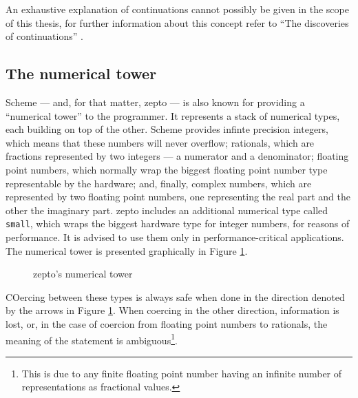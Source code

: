 \documentclass[oneside,11pt,xetex]{scrbook}
\begin{document}
An exhaustive explanation of continuations cannot possibly be given in the scope
of this thesis, for further information about this concept refer to ``The discoveries
of continuations'' \parencite{CONT}.

\subsection{The numerical tower}
\label{numbers}

Scheme --- and, for that matter, zepto --- is also known for providing a ``numerical
tower'' to the programmer. It represents a stack of numerical types, each building
on top of the other. Scheme provides infinte precision integers, which means that
these numbers will never overflow; rationals, which are fractions represented by
two integers --- a numerator and a denominator; floating point numbers, which normally
wrap the biggest floating point number type representable by the hardware; and, finally,
complex numbers, which are represented by two floating point numbers, one representing
the real part and the other the imaginary part. zepto includes an additional numerical
type called \texttt{small}, which wraps the biggest hardware type for integer numbers,
for reasons of performance. It is advised to use them only in performance-critical
applications. The numerical tower is presented graphically in Figure \ref{fig:numtower}.

\begin{figure}[H]
\centering
{}
\caption{zepto's numerical tower}
\label{fig:numtower}
\end{figure}

COercing between these types is always safe when done in the direction denoted
by the arrows in Figure \ref{fig:numtower}. When coercing in the other direction, information
is lost, or, in the case of coercion from floating point numbers to rationals, the meaning
of the statement is ambiguous\footnote{This is due to any finite floating point number
having an infinite number of representations as fractional values.}.
\end{document}
